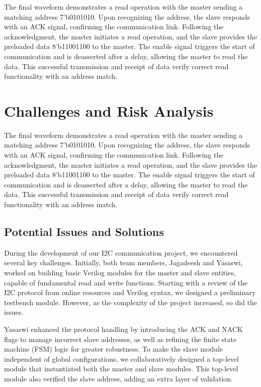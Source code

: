\documentclass[a4paper,12pt]{report}
\begin{document}
\noindent The final waveform demonstrates a read operation with the master sending a matching address 7'b0101010. Upon recognizing the address, the slave responds with an ACK signal, confirming the communication link. Following the acknowledgment, the master initiates a read operation, and the slave provides the preloaded data 8'b11001100 to the master. The enable signal triggers the start of communication and is deasserted after a delay, allowing the master to read the data. This successful transmission and receipt of data verify correct read functionality with an address match.


\newpage

\chapter{Challenges and Risk Analysis}

The final waveform demonstrates a read operation with the master sending a matching address 7'b0101010. Upon recognizing the address, the slave responds with an ACK signal, confirming the communication link. Following the acknowledgment, the master initiates a read operation, and the slave provides the preloaded data 8'b11001100 to the master. The enable signal triggers the start of communication and is deasserted after a delay, allowing the master to read the data. This successful transmission and receipt of data verify correct read functionality with an address match.

\section{Potential Issues and Solutions}
During the development of our I2C communication project, we encountered several key challenges. Initially, both team members, Jagadeesh and Yasaswi, worked on building basic Verilog modules for the master and slave entities, capable of fundamental read and write functions. Starting with a review of the I2C protocol from online resources and Verilog syntax, we designed a preliminary testbench module. However, as the complexity of the project increased, so did the issues.

\vspace{0.5in}

Yasaswi enhanced the protocol handling by introducing the ACK and NACK flags to manage incorrect slave addresses, as well as refining the finite state machine (FSM) logic for greater robustness. To make the slave module independent of global configurations, we collaboratively designed a top-level module that instantiated both the master and slave modules. This top-level module also verified the slave address, adding an extra layer of validation.
\end{document}
